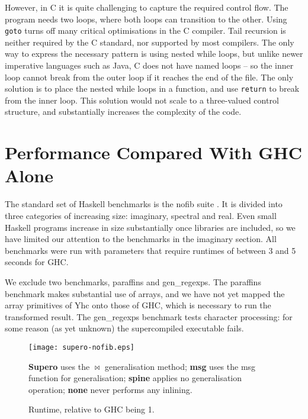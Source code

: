 However, in C it is quite challenging to capture the required control flow. The program needs two loops, where both loops can transition to the other. Using \texttt{goto} turns off many critical optimisations in the C compiler. Tail recursion is neither required by the C standard, nor supported by most compilers. The only way to express the necessary pattern is using nested while loops, but unlike newer imperative languages such as Java, C does not have named loops -- so the inner loop cannot break from the outer loop if it reaches the end of the file. The only solution is to place the nested while loops in a function, and use \texttt{return} to break from the inner loop. This solution would not scale to a three-valued control structure, and substantially increases the complexity of the code.

\section{Performance Compared With GHC Alone}
\label{sec:haskell_results}

The standard set of Haskell benchmarks is the nofib suite \cite{nofib}. It is divided into three categories of increasing size: imaginary, spectral and real. Even small Haskell programs increase in size substantially once libraries are included, so we have limited our attention to the benchmarks in the imaginary section. All benchmarks were run with parameters that require runtimes of between 3 and 5 seconds for GHC.

We exclude two benchmarks, paraffins and gen\_regexps. The paraffins benchmark makes substantial use of arrays, and we have not yet mapped the array primitives of Yhc onto those of GHC, which is necessary to run the transformed result. The gen\_regexps benchmark tests character processing: for some reason (as yet unknown) the supercompiled executable fails.

\begin{figure}
\begin{center}
\texttt{[image: supero-nofib.eps]}
\end{center}
\vspace{-4mm}

\textbf{Supero} uses the $\bowtie$ generalisation method; \textbf{msg} uses the msg function for generalisation; \textbf{spine} applies no generalisation operation; \textbf{none} never performs any inlining.

\vspace{2mm}
\caption{Runtime, relative to GHC being 1.}
\label{fig:haskell_results}
\end{figure}

